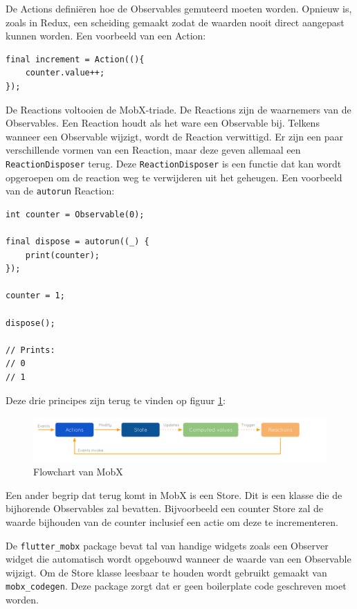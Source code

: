 De Actions definiëren hoe de Observables gemuteerd moeten worden. Opnieuw is, zoals in Redux, een scheiding gemaakt zodat de waarden nooit direct aangepast kunnen worden.
Een voorbeeld van een Action:
\begin{verbatim}
final increment = Action((){
    counter.value++;
});    
\end{verbatim}

De Reactions voltooien de MobX-triade. De Reactions zijn de waarnemers van de Observables. Een Reaction houdt als het ware een Observable bij. Telkens wanneer een Observable wijzigt, wordt de Reaction verwittigd. Er zijn een paar verschillende vormen van een Reaction, maar deze geven allemaal een \verb|ReactionDisposer| terug. Deze \verb|ReactionDisposer| is een functie dat kan wordt opgeroepen om de reaction weg te verwijderen uit het geheugen. Een voorbeeld van de \verb|autorun| Reaction:
\begin{verbatim}
int counter = Observable(0);

final dispose = autorun((_) {
    print(counter);
});

counter = 1;

dispose();

// Prints:
// 0
// 1
\end{verbatim}

Deze drie principes zijn terug te vinden op figuur \ref{fig:mobx-principles}:

\begin{figure}[H]
    \centering
    \includegraphics[width=\linewidth]{img/stand-van-zaken/mobx-principles.png}
    \caption{Flowchart van MobX \autocite{MobX2019}}
    \label{fig:mobx-principles}
\end{figure}

Een ander begrip dat terug komt in MobX is een Store. Dit is een klasse die de bijhorende Observables zal bevatten. Bijvoorbeeld een counter Store zal de waarde bijhouden van de counter inclusief een actie om deze te incrementeren.

De  \verb|flutter_mobx| package bevat tal van handige widgets zoals een Observer widget die automatisch wordt opgebouwd wanneer de waarde van een Observable wijzigt. 
Om de Store klasse leesbaar te houden wordt gebruikt gemaakt van \verb|mobx_codegen|. Deze package zorgt dat er geen boilerplate code geschreven moet worden. 
